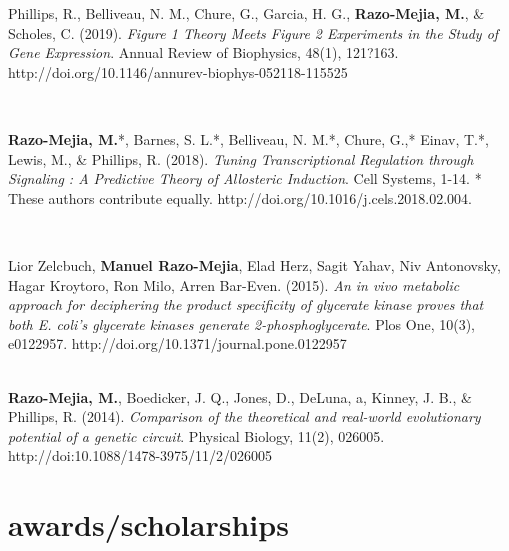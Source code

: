 \documentclass[]{friggeri-cv}
\begin{document}
\begin{flushleft}
Phillips, R., Belliveau, N. M., Chure, G., Garcia, H. G., \textbf{Razo-Mejia, M.}, & Scholes, C. (2019). \textit{Figure 1 Theory Meets Figure 2 Experiments in the Study of Gene Expression}. Annual Review of Biophysics, 48(1), 121?163.\linebreak
http://doi.org/10.1146/annurev-biophys-052118-115525
\end{flushleft}\\

\begin{flushleft}
\textbf{Razo-Mejia, M.}*, Barnes, S. L.*, Belliveau, N. M.*, Chure, G.,* Einav, T.*, Lewis, M., \& Phillips, R. (2018). \textit{Tuning Transcriptional Regulation through Signaling : A Predictive Theory of Allosteric Induction}. Cell Systems, 1-14. * These authors contribute equally. \linebreak
http://doi.org/10.1016/j.cels.2018.02.004.
\end{flushleft}\\

\begin{flushleft}
Lior Zelcbuch, \textbf{Manuel Razo-Mejia}, Elad Herz, Sagit Yahav, Niv Antonovsky, Hagar Kroytoro, Ron Milo, Arren Bar-Even. (2015). \textit{An in vivo metabolic approach for deciphering the product specificity of glycerate kinase proves that both E. coli's glycerate kinases generate 2-phosphoglycerate}. Plos One, 10(3), e0122957.\linebreak
http://doi.org/10.1371/journal.pone.0122957
\end{flushleft}\\

\textbf{Razo-Mejia, M.}, Boedicker, J. Q., Jones, D., DeLuna, a, Kinney, J. B., \& Phillips, R. (2014). \textit{Comparison of the theoretical and real-world evolutionary potential of a genetic circuit}. Physical Biology, 11(2), 026005.\linebreak
http://doi:10.1088/1478-3975/11/2/026005\\

\pagebreak

\section{awards/scholarships}
\end{document}
